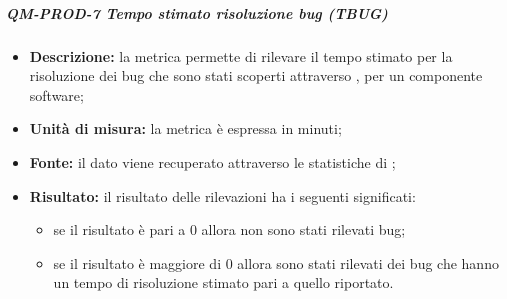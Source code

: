 			\subparagraph{ QM-PROD-7 Tempo stimato risoluzione bug (TBUG)}
			\begin{itemize}
      			\item \textbf{Descrizione: }
					la metrica permette di rilevare il tempo stimato per la risoluzione dei bug che sono stati scoperti attraverso , per un componente software;
				\item \textbf{Unità di misura: }
					la metrica è espressa in minuti;
				\item \textbf{Fonte: }
					il dato viene recuperato attraverso le statistiche di ;
				\item \textbf{Risultato: }
					il risultato delle rilevazioni ha i seguenti significati:
					\begin{itemize}
						\item se il risultato è pari a 0 allora non sono stati rilevati bug;
						\item se il risultato è maggiore di 0 allora sono stati rilevati dei bug che hanno un tempo di risoluzione stimato pari a quello riportato.
					\end{itemize}
			\end{itemize}



